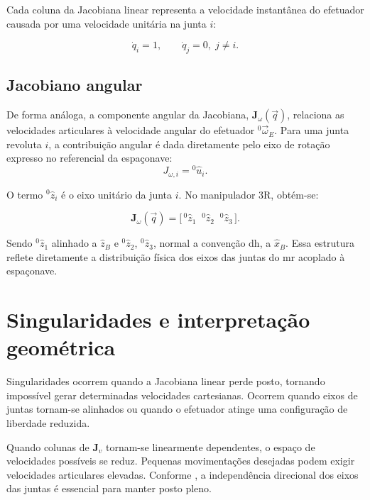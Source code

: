Cada coluna da Jacobiana linear representa a velocidade instantânea do efetuador causada por uma velocidade unitária na junta $i$:

\begin{equation}
\dot{q}_{i} = 1,
\qquad
\dot{q}_{j} = 0,\; j \neq i.
\end{equation}

\subsection{Jacobiano angular}

De forma análoga, a componente angular da Jacobiana, $\mathbf{J}_{\omega}(\vec q)$, relaciona as velocidades articulares à velocidade angular do efetuador ${}^{0}\!\vec{\omega}_{E}$. Para uma junta revoluta $i$, a contribuição angular é dada diretamente pelo eixo de rotação expresso no referencial da espaçonave:
\begin{equation}
J_{\omega,i} = {}^{0}\!\hat{u}_{i}.
\end{equation}

O termo ${}^{0}\!\hat{z}_{i}$ é o eixo unitário da junta $i$. No manipulador 3R, obtém-se:

\begin{equation}
\mathbf{J}_{\omega}(\vec q)=
\bigl[\,{}^{0}\!\hat{z}_{1}\;\;{}^{0}\!\hat{z}_{2}\;\;{}^{0}\!\hat{z}_{3}\,\bigr].
\end{equation}

Sendo ${}^{0}\!\hat{z}_{1}$ alinhado a $\hat{z}_{B}$ e ${}^{0}\!\hat{z}_{2}$, ${}^{0}\!\hat{z}_{3}$, normal a convenção \gls{dh}, a $\hat{x}_{B}$.
Essa estrutura reflete diretamente a distribuição física dos eixos das juntas do \gls{mr} acoplado à espaçonave.

\section{Singularidades e interpretação geométrica}
\label{sec_singularidades_jacobiana}

Singularidades ocorrem quando a Jacobiana linear perde posto, tornando impossível gerar determinadas velocidades cartesianas.
Ocorrem quando eixos de juntas tornam-se alinhados ou quando o efetuador atinge uma configuração de liberdade reduzida.

Quando colunas de $\mathbf{J}_{v}$ tornam-se linearmente dependentes, o espaço de velocidades possíveis se reduz. Pequenas movimentações desejadas podem exigir velocidades articulares elevadas. Conforme \cite{craig2005}, a independência direcional dos eixos das juntas é essencial para manter posto pleno.

